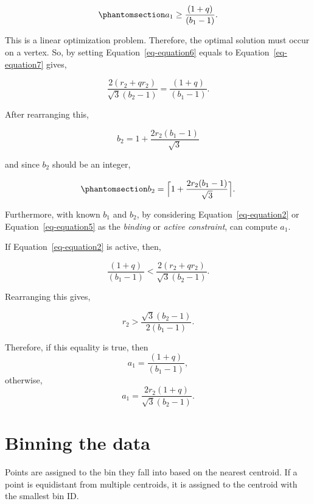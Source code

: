 \documentclass[
  12pt]{article}
\begin{document}
\begin{equation}\phantomsection\label{eq-equation7}{
a_1 \geq \frac{(1 + q)}{(b_1 - 1)}.
}\end{equation}

This is a linear optimization problem. Therefore, the optimal solution
must occur on a vertex. So, by setting Equation~\ref{eq-equation6}
equals to Equation~\ref{eq-equation7} gives,

\[
\frac{2(r_2 + qr_2)}{\sqrt{3}(b_2 - 1)} = \frac{(1 + q)}{(b_1 - 1)}.
\]

After rearranging this,

\[
b_2 = 1 + \frac{2r_2(b_1 - 1)}{\sqrt{3}}
\]

and since \(b_2\) should be an integer,

\begin{equation}\phantomsection\label{eq-equation8}{
b_2 = \Big\lceil1 +\frac{2r_2(b_1 - 1)}{\sqrt{3}}\Big\rceil.
}\end{equation}

Furthermore, with known \(b_1\) and \(b_2\), by considering
Equation~\ref{eq-equation2} or Equation~\ref{eq-equation5} as the
\emph{binding} or \emph{active constraint}, can compute \(a_1\).

If Equation~\ref{eq-equation2} is active, then,

\[
\frac{(1 + q)}{(b_1 - 1)} < \frac{2(r_2 + qr_2)}{\sqrt{3}(b_2 - 1)}.
\]

Rearranging this gives,

\[
r_2 > \frac{\sqrt{3}(b_2 - 1)}{2(b_1 - 1)}.
\]

Therefore, if this equality is true, then \[
a_1 = \frac{(1+q)}{(b_1 - 1)},
\] otherwise, \[
a_1 = \frac{2r_2(1+q)}{\sqrt{3}(b_2 - 1)}.
\]

\section{Binning the data}\label{binning-the-data}

Points are assigned to the bin they fall into based on the nearest
centroid. If a point is equidistant from multiple centroids, it is
assigned to the centroid with the smallest bin ID.
\end{document}
